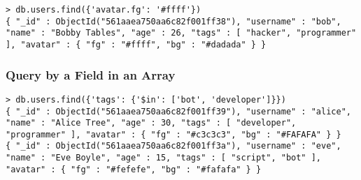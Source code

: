 \begin{lstlisting}
> db.users.find({'avatar.fg': '#ffff'})
{ "_id" : ObjectId("561aaea750aa6c82f001ff38"), "username" : "bob", "name" : "Bobby Tables", "age" : 26, "tags" : [ "hacker", "programmer" ], "avatar" : { "fg" : "#ffff", "bg" : "#dadada" } }
\end{lstlisting}


\subsubsection{Query by a Field in an Array}

\begin{lstlisting}
> db.users.find({'tags': {'$in': ['bot', 'developer']}})
{ "_id" : ObjectId("561aaea750aa6c82f001ff39"), "username" : "alice", "name" : "Alice Tree", "age" : 30, "tags" : [ "developer", "programmer" ], "avatar" : { "fg" : "#c3c3c3", "bg" : "#FAFAFA" } }
{ "_id" : ObjectId("561aaea750aa6c82f001ff3a"), "username" : "eve", "name" : "Eve Boyle", "age" : 15, "tags" : [ "script", "bot" ], "avatar" : { "fg" : "#fefefe", "bg" : "#fafafa" } }
\end{lstlisting}
